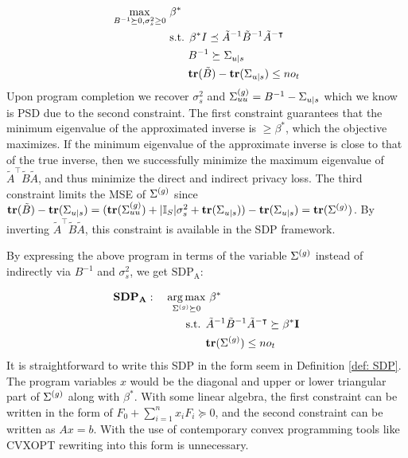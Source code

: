 \begin{align*}
	\max_{B^{-1} \succeq 0 , \sigma_s^2 \geq 0} \ &\beta^* \\
	&\text{s.t. } \beta^* I  \preceq \tilde{A}^{-1} \tilde{B}^{-1} \tilde{A}^{-\intercal} \\
	& \quad \ \ B^{-1} \succeq \Sigma_{u|s} \\
	&\quad \ \ \mathbf{tr}(\tilde{B}) -  \mathbf{tr}{(\Sigma_{u|s})} \leq n o_t 
\end{align*}
Upon program completion we recover $\sigma_s^2$ and $\Sigma^{(g)}_{uu} = B^{-1} - \Sigma_{u|s}$ which we know is PSD due to the second constraint. The first constraint guarantees that the minimum eigenvalue of the approximated inverse is $\geq \beta^*$, which the objective maximizes. If the minimum eigenvalue of the approximate inverse is close to that of the true inverse, then we successfully minimize the maximum eigenvalue of $\tilde{A}^\intercal \tilde{B} \tilde{A}$, and thus minimize the direct and indirect privacy loss. The third constraint limits the MSE of $\Sigma^{(g)}$ since $\mathbf{tr}(\tilde{B}) - \mathbf{tr}(\Sigma_{u|s}) = (\mathbf{tr}(\Sigma^{(g)}_{uu}) + |{\mathbb{I}_S}| \sigma_s^2 + \mathbf{tr}(\Sigma_{u|s})) - \mathbf{tr}(\Sigma_{u|s}) = \mathbf{tr}(\Sigma^{(g)})$. By inverting $\tilde{A}^\intercal \tilde{B} \tilde{A}$, this constraint is available in the SDP framework. 

By expressing the above program in terms of the variable $\Sigma^{(g)}$ instead of indirectly via $B^{-1}$ and $\sigma_s^2$, we get $\text{SDP}_\text{A}$: 

\begin{align*}
	\textbf{SDP}_\textbf{A}: \quad 
	\operatorname*{arg\,max}_{\Sigma^{(g)} \succeq 0}& \ \beta^* \\
	\text{s.t. }& \tilde{A}^{-1} \tilde{B}^{-1} \tilde{A}^{-\intercal} \succeq \beta^* \mathbf{I} \\
	&\mathbf{tr}(\Sigma^{(g)}) \leq n o_t
\end{align*}
It is straightforward to write this SDP in the form seem in Definition \ref{def: SDP}. The program variables $x$ would be the diagonal and upper or lower triangular part of $\Sigma^{(g)}$ along with $\beta^*$. With some linear algebra, the first constraint can be written in the form of $F_0 + \sum_{i=1}^n x_i F_i \succeq 0$, and the second constraint can be written as $Ax = b$. With the use of contemporary convex programming tools like CVXOPT \citep{cvxopt} rewriting into this form is unnecessary. 

